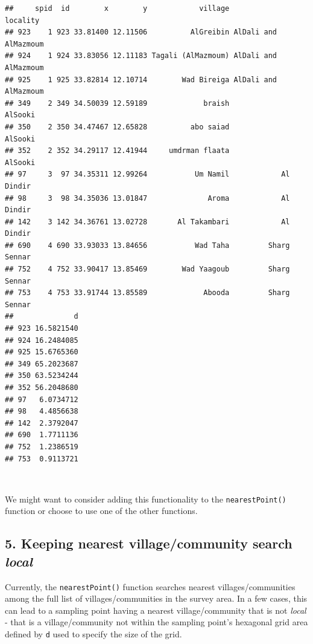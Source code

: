 \documentclass[11pt,a4paper]{article}
\begin{document}
\begin{verbatim}
##     spid  id        x        y            village             locality
## 923    1 923 33.81400 12.11506          AlGreibin AlDali and AlMazmoum
## 924    1 924 33.83056 12.11183 Tagali (AlMazmoum) AlDali and AlMazmoum
## 925    1 925 33.82814 12.10714        Wad Bireiga AlDali and AlMazmoum
## 349    2 349 34.50039 12.59189             braish              AlSooki
## 350    2 350 34.47467 12.65828          abo saiad              AlSooki
## 352    2 352 34.29117 12.41944     umdrman flaata              AlSooki
## 97     3  97 34.35311 12.99264           Um Namil            Al Dindir
## 98     3  98 34.35036 13.01847              Aroma            Al Dindir
## 142    3 142 34.36761 13.02728       Al Takambari            Al Dindir
## 690    4 690 33.93033 13.84656           Wad Taha         Sharg Sennar
## 752    4 752 33.90417 13.85469        Wad Yaagoub         Sharg Sennar
## 753    4 753 33.91744 13.85589             Abooda         Sharg Sennar
##              d
## 923 16.5821540
## 924 16.2484085
## 925 15.6765360
## 349 65.2023687
## 350 63.5234244
## 352 56.2048680
## 97   6.0734712
## 98   4.4856638
## 142  2.3792047
## 690  1.7711136
## 752  1.2386519
## 753  0.9113721
\end{verbatim}

~

We might want to consider adding this functionality to the
\texttt{nearestPoint()} function or choose to use one of the other
functions.

\newpage

\hypertarget{keeping-nearest-villagecommunity-search-local}{%
\subsection{\texorpdfstring{5. Keeping nearest village/community search
\emph{local}}{5. Keeping nearest village/community search local}}\label{keeping-nearest-villagecommunity-search-local}}

Currently, the \texttt{nearestPoint()} function searches nearest
villages/communities among the full list of villages/communities in the
survey area. In a few cases, this can lead to a sampling point having a
nearest village/community that is not \emph{local} - that is a
village/community not within the sampling point's hexagonal grid area
defined by \texttt{d} used to specify the size of the grid.

~
\end{document}
